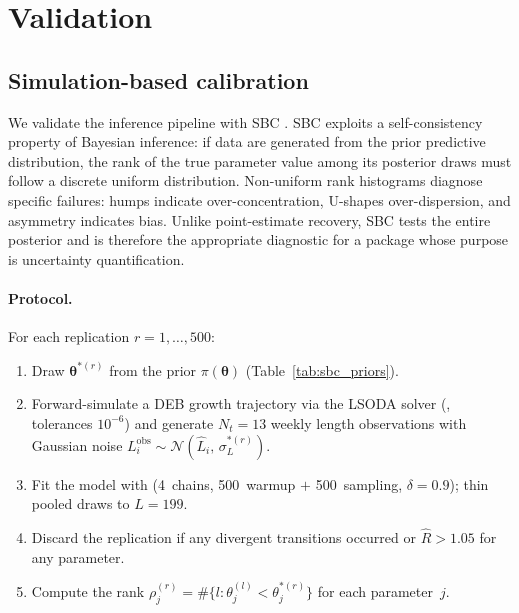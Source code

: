 \documentclass[article,shortnames]{jss}
\begin{document}
\section{Validation} \label{sec:validation}

\subsection{Simulation-based calibration} \label{sec:sbc}

We validate the inference pipeline with SBC
\citep{TaltsSBC2018}.  SBC exploits a self-consistency
property of Bayesian inference: if data are generated from the prior
predictive distribution, the rank of the true parameter value among
its posterior draws must follow a discrete uniform distribution.
Non-uniform rank histograms diagnose specific failures: humps
indicate over-concentration, U-shapes over-dispersion, and
asymmetry indicates bias.  Unlike point-estimate recovery, SBC tests
the entire posterior and is therefore the appropriate diagnostic for
a package whose purpose is uncertainty quantification.

\paragraph{Protocol.}
For each replication $r = 1, \ldots, 500$:
\begin{enumerate}
  \item Draw $\boldsymbol{\theta}^{*(r)}$ from the prior
    $\pi(\boldsymbol{\theta})$ (Table~\ref{tab:sbc_priors}).
  \item Forward-simulate a DEB growth trajectory via the LSODA
    solver (, tolerances $10^{-6}$) and generate $N_t = 13$
    weekly length observations with Gaussian noise
    $L_i^{\mathrm{obs}} \sim \mathcal{N}(\hat{L}_i,\,
    \sigma_L^{*(r)})$.
  \item Fit the  model with
     (4~chains, 500~warmup $+$ 500~sampling,
    $\delta = 0.9$); thin pooled draws to $L = 199$.
  \item Discard the replication if any divergent transitions
    occurred or $\hat{R} > 1.05$ for any parameter.
  \item Compute the rank $\rho_j^{(r)} = \#\{l :
    \theta_j^{(l)} < \theta_j^{*(r)}\}$ for each parameter~$j$.
\end{enumerate}
\end{document}
